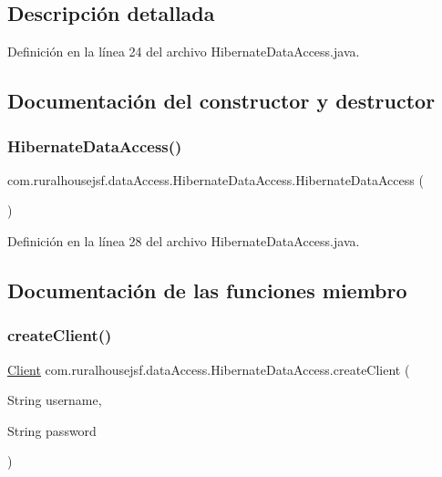 \subsection{Descripción detallada}


Definición en la línea 24 del archivo Hibernate\+Data\+Access.\+java.



\subsection{Documentación del constructor y destructor}
\mbox{\label{classcom_1_1ruralhousejsf_1_1data_access_1_1_hibernate_data_access_a8e0ec929d78d37a992837db0ba7e9602}} 
\subsubsection{\texorpdfstring{HibernateDataAccess()}{HibernateDataAccess()}}
{\footnotesize\ttfamily com.\+ruralhousejsf.\+data\+Access.\+Hibernate\+Data\+Access.\+Hibernate\+Data\+Access (\begin{DoxyParamCaption}{ }\end{DoxyParamCaption})}



Definición en la línea 28 del archivo Hibernate\+Data\+Access.\+java.



\subsection{Documentación de las funciones miembro}
\mbox{\label{classcom_1_1ruralhousejsf_1_1data_access_1_1_hibernate_data_access_ab1113c4a35f6f888d6bee15f25b117d5}} 
\subsubsection{\texorpdfstring{createClient()}{createClient()}}
{\footnotesize\ttfamily \mbox{\hyperlink{classcom_1_1ruralhousejsf_1_1domain_1_1_client}{Client}} com.\+ruralhousejsf.\+data\+Access.\+Hibernate\+Data\+Access.\+create\+Client (\begin{DoxyParamCaption}\item[{String}]{username,  }\item[{String}]{password }\end{DoxyParamCaption})}



